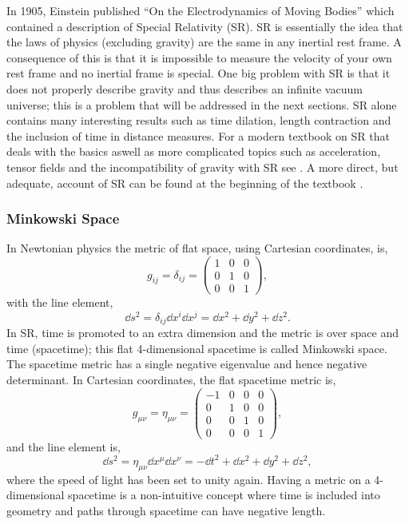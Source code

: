 In 1905, Einstein published \enquote{On the Electrodynamics of Moving Bodies} \cite{einstein1905electrodynamics} which contained a description of Special Relativity (SR). SR is essentially the idea that the laws of physics (excluding gravity) are the same in any inertial rest frame. A consequence of this is that it is impossible to measure the velocity of your own rest frame and no inertial frame is special. One big problem with SR is that it does not properly describe gravity and thus describes an infinite vacuum universe; this is a problem that will be addressed in the next sections. SR alone contains many interesting results such as time dilation, length contraction and the inclusion of time in distance measures.
For a modern textbook on SR that deals with the basics aswell as more complicated topics such as acceleration, tensor fields and
the incompatibility of gravity with SR see \cite{gourgoulhon2016special}. A more
direct, but adequate, account of SR can be found at the beginning of the textbook \cite{carroll2019spacetime}.

\subsubsection{Minkowski Space}\label{intro:sec:minkowski_space}
In Newtonian physics the metric of flat space, using Cartesian coordinates, is,
\begin{equation}
g_{ij} = \delta_{ij} = \begin{pmatrix} 1 & 0 & 0 \\ 0 & 1 & 0 \\ 0 & 0 & 1 \end{pmatrix},
\end{equation}
with the line element,
\begin{equation}
\dd s ^2 = \delta_{ij} \dd x^i \dd x^j = \dd x^2 + \dd y^2 + \dd z^2.
\end{equation}
In SR, time is promoted to an extra dimension and the metric is over space and time (spacetime); this flat 4-dimensional spacetime is called Minkowski space. The spacetime metric has a single negative eigenvalue and hence negative determinant. In Cartesian coordinates, the flat spacetime metric is,
\begin{equation}
g_{\mu\nu} = \eta_{\mu\nu} = \begin{pmatrix} -1 &0 &0 &0\\ 0 & 1 & 0 & 0 \\ 0 & 0 & 1 & 0 \\ 0 & 0 & 0 & 1 \end{pmatrix},
\end{equation}
and the line element is,
\begin{equation}
\dd s ^2 = \eta_{\mu\nu} \dd x^\mu \dd x^\nu = -\dd t^2 + \dd x^2 + \dd y^2 + \dd z^2,
\end{equation}
where the speed of light has been set to unity again. Having a metric on a 4-dimensional spacetime is a non-intuitive concept where time is included into geometry and paths through spacetime can have negative length.

